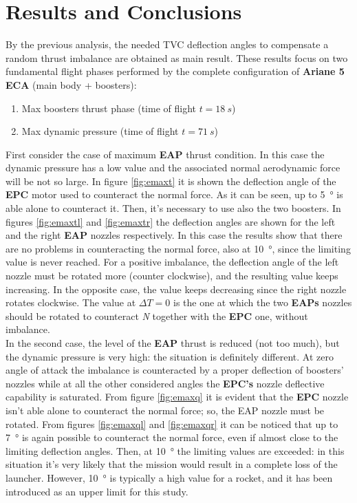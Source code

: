 \documentclass[12pt,fleqn,openany]{book} %
\begin{document}
\chapter{Results and Conclusions}
By the previous analysis, the needed TVC deflection angles to compensate a random thrust imbalance are obtained as main result. These results focus on two fundamental flight phases performed by the complete configuration of \textbf{Ariane 5 ECA} (main body + boosters):
\begin{enumerate}
 \item Max boosters thrust phase (time of flight $t = \SI{18}{s}$)
 \item Max dynamic pressure (time of flight $t=\SI{71}{s}$)\\
\end{enumerate}
 First consider the case of maximum \textbf{EAP} thrust condition. In this case the dynamic pressure has a low value and the associated normal aerodynamic force will be not so large. In figure \hypertarget{fig:emaxt}{\ref{fig:emaxt}} it is shown the deflection angle of the \textbf{EPC} motor used to counteract the normal force. As it can be seen, up to \SI{5}{\degree} is able alone to counteract it. Then, it’s necessary to use also the two boosters. In figures \hypertarget{fig:emaxtl}{\ref{fig:emaxtl}} and \hypertarget{fig:emaxtr}{\ref{fig:emaxtr}} the deflection angles are shown for the left and the right \textbf{EAP} nozzles respectively. In this case the results show that there are no problems in counteracting the normal force, also at \SI{10}{\degree}, since the limiting value is never reached. For a positive imbalance, the deflection angle of the left nozzle must be rotated more (counter clockwise), and the resulting value keeps increasing. In the opposite case, the value keeps decreasing since the right nozzle rotates clockwise. The value at $\Delta T = 0$ is the one at which the two \textbf{EAPs} nozzles should be rotated to counteract \textit{N} together with the \textbf{EPC} one, without imbalance. \\ 
 In the second case, the level of the \textbf{EAP} thrust is reduced (not too much), but the dynamic pressure is very high: the situation is definitely different. At zero angle of attack the imbalance is counteracted by a proper deflection of boosters’ nozzles while at all the other considered angles the \textbf{EPC’s} nozzle deflective capability is saturated. From figure \hypertarget{fig:emaxq}{\ref{fig:emaxq}} it is evident that the \textbf{EPC} nozzle isn’t able alone to counteract the normal force; so, the EAP nozzle must be rotated. From figures \hypertarget{fig:emaxql}{\ref{fig:emaxql}} and \hypertarget{fig:emaxqr}{\ref{fig:emaxqr}} it can be noticed that up to \SI{7}{\degree} is again possible to counteract the normal force, even if almost close to the limiting deflection angles. Then, at \SI{10}{\degree} the limiting values are exceeded: in this situation it’s very likely that the mission would result in a complete loss of the launcher. However, \SI{10}{\degree} is typically a high value for a rocket, and it has been introduced as an upper limit for this study.  
\end{document}

